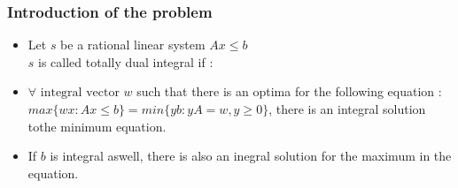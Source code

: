 \documentclass{beamer}
\begin{document}
\begin{frame}
	\frametitle{Introduction of the problem}
	\begin{itemize}
		\item Let $s$ be a rational linear system $Ax \leqslant b$\\
		$s$ is called totally dual integral if :
 
		\item $\forall \text{ integral vector }w$ such that there is an optima for the following equation : $max\{wx:Ax\leqslant b\}=min\{yb:yA=w,y\geqslant 0\}$, there is an integral solution tothe minimum equation. 
		\item If $b$ is integral aswell, there is also an inegral solution for the maximum in the equation.
	\end{itemize}

\end{frame}
\end{document}
